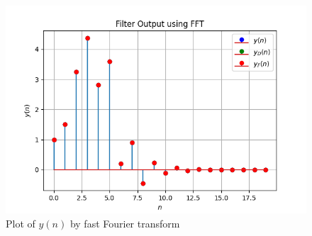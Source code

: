 \documentclass[journal,12pt,twocolumn]{IEEEtran}
\renewcommand\thesection{\arabic{section}}
\begin{document}
\begin{enumerate}[label=\thesection.\arabic*]
	\begin{figure}[!ht]
		\centering
		\includegraphics[width=\columnwidth]{./figs/6_4.png}
		\caption{Plot of $y(n)$ by fast Fourier transform}
		\label{fig-6.4.3}	
	\end{figure}
 
\end{enumerate}
\end{document}

